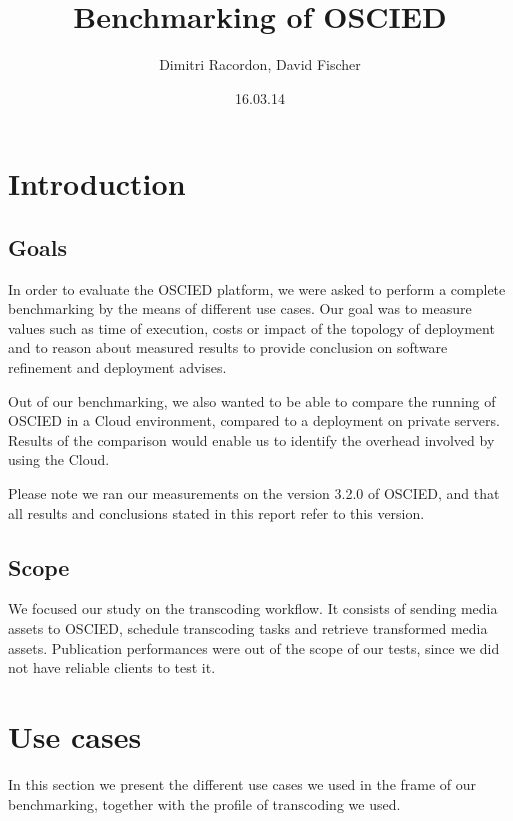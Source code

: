 \documentclass[a4paper, titlepage]{paper}
\numberwithin{figure}{section}
\numberwithin{table}{section}
\begin{document}
  \title{Benchmarking of OSCIED}
  \author{Dimitri Racordon, David Fischer}
  \date{16.03.14}
  \maketitle

  \clearpage

  \section{Introduction}
    \subsection{Goals}
      In order to evaluate the OSCIED platform, we were asked to perform a complete benchmarking by the means of different use cases. Our goal was to measure values such as time of execution, costs or impact of the topology of deployment and to reason about measured results to provide conclusion on software refinement and deployment advises.

      Out of our benchmarking, we also wanted to be able to compare the running of OSCIED in a Cloud environment, compared to a deployment on private servers. Results of the comparison would enable us to identify the overhead involved by using the Cloud.

      Please note we ran our measurements on the version 3.2.0 of OSCIED, and that all results and conclusions stated in this report refer to this version.

    \subsection{Scope}
      We focused our study on the transcoding workflow. It consists of sending media assets to OSCIED, schedule transcoding tasks and retrieve transformed media assets. Publication performances were out of the scope of our tests, since we did not have reliable clients to test it.

  \section{Use cases}
    In this section we present the different use cases we used in the frame of our benchmarking, together with the profile of transcoding we used.
\end{document}
